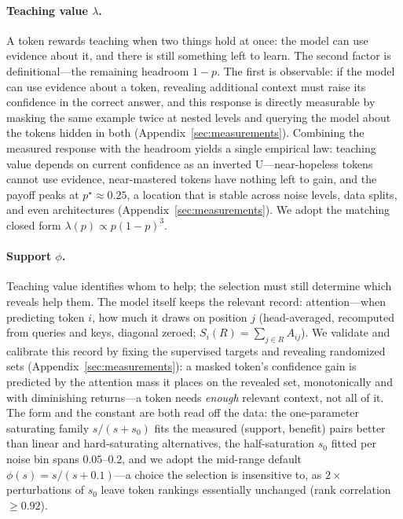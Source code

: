 \documentclass{article} %
\begin{document}
\paragraph{Teaching value $\lambda$.} A token rewards teaching when two things hold at once: the model can use evidence about it, and there is still something left to learn. The second factor is definitional---the remaining headroom $1-p$. The first is observable: if the model can use evidence about a token, revealing additional context must raise its confidence in the correct answer, and this response is directly measurable by masking the same example twice at nested levels and querying the model about the tokens hidden in both (Appendix~\ref{sec:measurements}). Combining the measured response with the headroom yields a single empirical law: teaching value depends on current confidence as an inverted U---near-hopeless tokens cannot use evidence, near-mastered tokens have nothing left to gain, and the payoff peaks at $p^\star\!\approx\!0.25$, a location that is stable across noise levels, data splits, and even architectures (Appendix~\ref{sec:measurements}). We adopt the matching closed form $\lambda(p) \propto p(1-p)^3$.

\paragraph{Support $\phi$.} Teaching value identifies whom to help; the selection must still determine which reveals help them. The model itself keeps the relevant record: attention---when predicting token $i$, how much it draws on position $j$ (head-averaged, recomputed from queries and keys, diagonal zeroed; $S_i(R) = \sum_{j\in R} A_{ij}$). We validate and calibrate this record by fixing the supervised targets and revealing randomized sets (Appendix~\ref{sec:measurements}): a masked token's confidence gain is predicted by the attention mass it places on the revealed set, monotonically and with diminishing returns---a token needs \emph{enough} relevant context, not all of it. The form and the constant are both read off the data: the one-parameter saturating family $s/(s+s_0)$ fits the measured (support, benefit) pairs better than linear and hard-saturating alternatives, the half-saturation $s_0$ fitted per noise bin spans $0.05$--$0.2$, and we adopt the mid-range default $\phi(s) = s/(s+0.1)$---a choice the selection is insensitive to, as $2\times$ perturbations of $s_0$ leave token rankings essentially unchanged (rank correlation $\geq 0.92$). 
\end{document}

